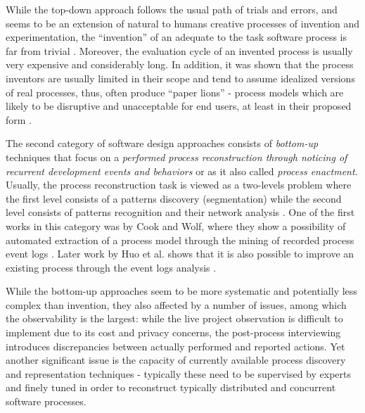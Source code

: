 While the top-down approach follows the usual path of trials and errors, and seems to be an 
extension of natural to humans creative processes of invention and experimentation, 
the ``invention'' of an adequate to the task software process is far from trivial 
\cite{citeulike:5043104} \cite{citeulike:1986013}. 
Moreover, the evaluation cycle of an invented process is usually very expensive and considerably long.
In addition, it was shown that the process inventors are usually limited in their scope and tend to 
assume idealized versions of real processes, thus, often produce ``paper lions'' - process models which are 
likely to be disruptive and unacceptable for end users, at least in their proposed form \cite{citeulike:9758924}.

The second category of software design approaches consists of \textit{bottom-up} techniques 
that focus on a \textit{performed process reconstruction through noticing of recurrent development 
events and behaviors} or as it also called \textit{process enactment}. 
Usually, the process reconstruction task is viewed as a two-levels problem where the first level 
consists of a patterns discovery (segmentation) while the second level consists of patterns recognition 
and their network analysis \cite{citeulike:2703162}.
One of the first works in this category was by Cook and Wolf, where they show a
possibility of automated extraction of a process model through the mining of recorded 
process event logs \cite{citeulike:328044} \cite{citeulike:5120757} \cite{citeulike:5128143}. 
Later work by Huo et al. shows that it is also possible to improve an existing process
through the event logs analysis \cite{citeulike:7691059} \cite{citeulike:7690766}. 

While the bottom-up approaches seem to be more systematic and potentially less complex than invention, 
they also affected by a number of issues, among which the observability is the largest: 
while the live project observation is difficult to implement due to its cost and privacy concerns, 
the post-process interviewing introduces discrepancies between actually performed and reported actions. 
Yet another significant issue is the capacity of currently available process discovery and representation 
techniques - typically these need to be supervised by experts and finely tuned in order to reconstruct 
typically distributed and concurrent software processes. 

